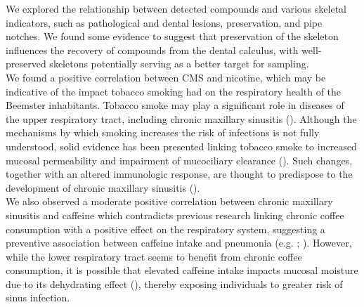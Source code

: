 \documentclass[
  b5paper,
]{book}
\begin{document}
We explored the relationship between detected compounds and various
skeletal indicators, such as pathological and dental lesions,
preservation, and pipe notches. We found some evidence to suggest that
preservation of the skeleton influences the recovery of compounds from
the dental calculus, with well-preserved skeletons potentially serving
as a better target for sampling.\\
We found a positive correlation between CMS and nicotine, which may be
indicative of the impact tobacco smoking had on the respiratory health
of the Beemster inhabitants. Tobacco smoke may play a significant role
in diseases of the upper respiratory tract, including chronic maxillary
sinusitis ().
Although the mechanisms by which smoking increases the risk of
infections is not fully understood, solid evidence has been presented
linking tobacco smoke to increased mucosal permeability and impairment
of mucociliary clearance
().
Such changes, together with an altered immunologic response, are thought
to predispose to the development of chronic maxillary sinusitis
().\\
We also observed a moderate positive correlation between chronic
maxillary sinusitis and caffeine which contradicts previous research
linking chronic coffee consumption with a positive effect on the
respiratory system, suggesting a preventive association between caffeine
intake and pneumonia (e.g. ; ). However, while the lower respiratory tract seems to benefit from
chronic coffee consumption, it is possible that elevated caffeine intake
impacts mucosal moisture due to its dehydrating effect
(),
thereby exposing individuals to greater risk of sinus infection.
\end{document}
